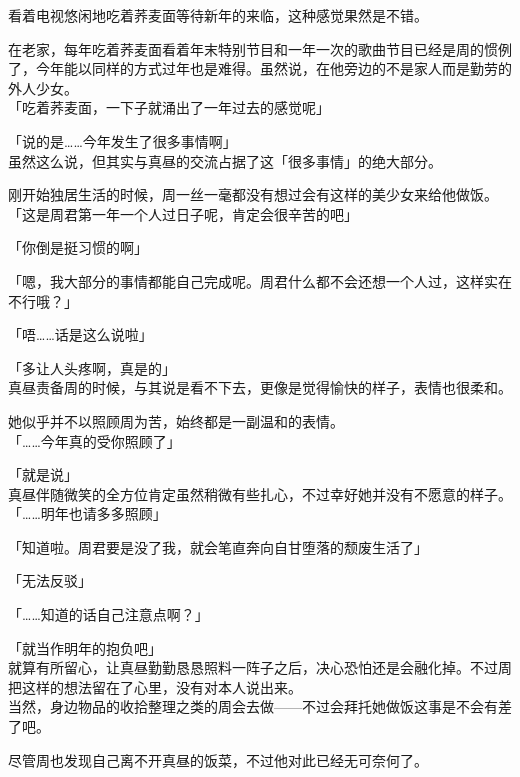 看着电视悠闲地吃着荞麦面等待新年的来临，这种感觉果然是不错。

在老家，每年吃着荞麦面看着年末特别节目和一年一次的歌曲节目已经是周的惯例了，今年能以同样的方式过年也是难得。虽然说，在他旁边的不是家人而是勤劳的外人少女。\\

「吃着荞麦面，一下子就涌出了一年过去的感觉呢」

「说的是……今年发生了很多事情啊」\\

虽然这么说，但其实与真昼的交流占据了这「很多事情」的绝大部分。

刚开始独居生活的时候，周一丝一毫都没有想过会有这样的美少女来给他做饭。\\

「这是周君第一年一个人过日子呢，肯定会很辛苦的吧」

「你倒是挺习惯的啊」

「嗯，我大部分的事情都能自己完成呢。周君什么都不会还想一个人过，这样实在不行哦？」

「唔……话是这么说啦」

「多让人头疼啊，真是的」\\

真昼责备周的时候，与其说是看不下去，更像是觉得愉快的样子，表情也很柔和。

她似乎并不以照顾周为苦，始终都是一副温和的表情。\\

「……今年真的受你照顾了」

「就是说」\\

真昼伴随微笑的全方位肯定虽然稍微有些扎心，不过幸好她并没有不愿意的样子。\\

「……明年也请多多照顾」

「知道啦。周君要是没了我，就会笔直奔向自甘堕落的颓废生活了」

「无法反驳」

「……知道的话自己注意点啊？」

「就当作明年的抱负吧」\\

就算有所留心，让真昼勤勤恳恳照料一阵子之后，决心恐怕还是会融化掉。不过周把这样的想法留在了心里，没有对本人说出来。\\

当然，身边物品的收拾整理之类的周会去做——不过会拜托她做饭这事是不会有差了吧。

尽管周也发现自己离不开真昼的饭菜，不过他对此已经无可奈何了。\\

